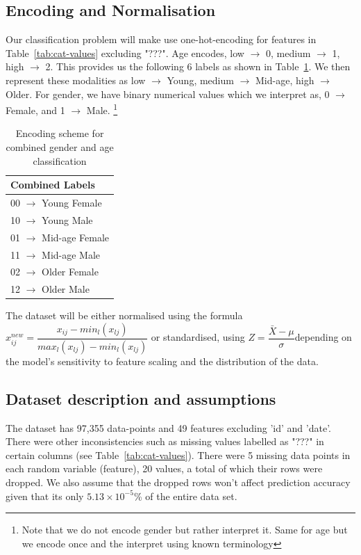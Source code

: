 \documentclass[10pt,twocolumn]{article}
\begin{document}
\subsection{Encoding and Normalisation}
Our classification problem will make use one-hot-encoding for features in Table~\ref{tab:cat-values} excluding "???".  Age encodes,  low $\rightarrow$ 0, medium $\rightarrow$ 1, high $\rightarrow$ 2. This provides us the following 6 labels as shown in Table~\ref{tab:encoding-scheme}. 
We then represent these modalities as low $\rightarrow$ Young, medium $\rightarrow$ Mid-age, high $\rightarrow$ Older.
For gender, we have binary numerical values which we interpret as, 0 $\rightarrow$ Female, and 1 $\rightarrow$ Male. 
\footnote{Note that we do not encode gender but rather interpret it. Same for age but we encode once and the interpret using known terminology}
\begin{table}[H]
\centering
\caption{Encoding scheme for combined gender and age classification}
\begin{tabular}{|l|}
\hline
\textbf{Combined Labels} \\
\hline
00 $\rightarrow$ Young Female \\
10 $\rightarrow$ Young Male \\
01 $\rightarrow$ Mid-age Female \\
11 $\rightarrow$ Mid-age Male \\
02 $\rightarrow$ Older Female \\
12 $\rightarrow$ Older Male \\
\hline
\end{tabular}
\label{tab:encoding-scheme}
\end{table}
The dataset will be either normalised using the formula $x_{ij}^{new} = {\dfrac {x_{ij} - min_l{(x_{lj})}} {max_l{(x_{lj})} - min_l{(x_{lj})}}}$ or standardised, using   $Z={\dfrac {\bar{X} - \mu} {\sigma}}$depending on the model's sensitivity to feature scaling and the distribution of the data.
\subsection{Dataset description and assumptions}
\label{subsec:dataset-description-and-assumptions}
The dataset has 97,355 data-points and 49 features excluding 'id' and 'date'. There were other inconsistencies such as missing values labelled as "???" in certain columns (see Table~\ref{tab:cat-values}). There were 5 missing data points in each random variable (feature), 20 values, a total of which their rows were dropped. We also assume that the dropped rows won't affect prediction accuracy given that its only $5.13 \times 10^{-5}$\% of the entire data set.
\end{document}
